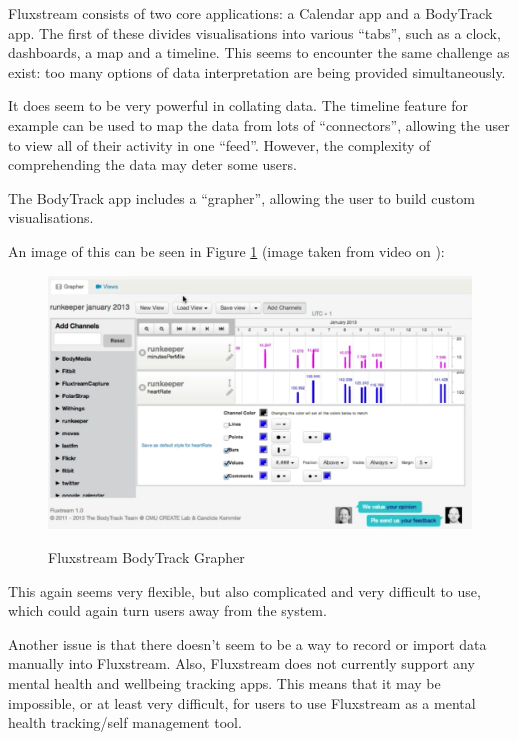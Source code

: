 \documentclass[11pt,openright,a4paper]{report}
\begin{document}
Fluxstream consists of two core applications: a Calendar app and a BodyTrack app. The first of these divides visualisations into various \enquote{tabs}, such as a clock, dashboards, a map and a timeline. This seems to encounter the same challenge as exist: too many options of data interpretation are being provided simultaneously.

It does seem to be very powerful in collating data. The timeline feature for example can be used to map the data from lots of \enquote{connectors}, allowing the user to view all of their activity in one \enquote{feed}. However, the complexity of comprehending the data may deter some users.

The BodyTrack app includes a \enquote{grapher}, allowing the user to build custom visualisations.

\newpage
An image of this can be seen in Figure \ref{fig:fluxstream} (image taken from video on \parencite{fluxstream}):
\begin{figure}[ht]
\centering
\caption{Fluxstream BodyTrack Grapher}
\includegraphics[width=\textwidth]{i/fluxstream.png}
\label{fig:fluxstream}
\end{figure}

This again seems very flexible, but also complicated and very difficult to use, which could again turn users away from the system.

Another issue is that there doesn't seem to be a way to record or import data manually into Fluxstream. Also, Fluxstream does not currently support any mental health and wellbeing tracking apps. This means that it may be impossible, or at least very difficult, for users to use Fluxstream as a mental health tracking/self management tool.
\end{document}
